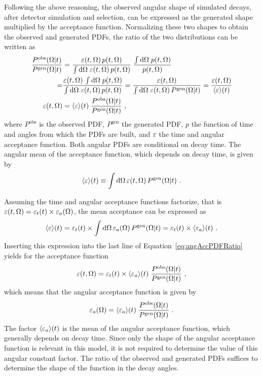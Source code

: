 Following the above reasoning, the observed angular shape of simulated decays, after detector simulation and selection, can be expressed as
the generated shape multiplied by the acceptance function. Normalizing these two shapes to obtain the observed and generated PDFs, the
ratio of the two distributions can be written as
\begin{equation}
  \begin{aligned}
    \frac{P^\text{obs}(\Omega|t)}{P^\text{gen}(\Omega|t)}
        &= \frac{\varepsilon(t,\Omega)\, p(t,\Omega)}{\int\mathrm{d}\Omega\; \varepsilon(t,\Omega)\, p(t,\Omega)}\; \frac{\int\mathrm{d}\Omega\; p(t,\Omega)}{p(t,\Omega)}\\
         = &\frac{\varepsilon(t,\Omega)\, \int\mathrm{d}\Omega\; p(t,\Omega)}{\int\mathrm{d}\Omega\; \varepsilon(t,\Omega)\, p(t,\Omega)}
         = \frac{\varepsilon(t,\Omega)}{\int\mathrm{d}\Omega\; \varepsilon(t,\Omega)\, P^\text{gen}(\Omega|t)}
         = \frac{\varepsilon(t,\Omega)}{\langle\varepsilon\rangle(t)}\\
        \varepsilon(t,\Omega) &= \langle\varepsilon\rangle(t)\; \frac{P^\text{obs}(\Omega|t)}{P^\text{gen}(\Omega|t)} \ ,
  \end{aligned}
  \label{eq:angAccPDFRatio}
\end{equation}
where $P^\text{obs}$ is the observed PDF, $P^\text{gen}$ the generated PDF, $p$ the function of time and angles from which the PDFs are
built, and $\varepsilon$ the time and angular acceptance function. Both angular PDFs are conditional on decay time. The angular mean of the
acceptance function, which depends on decay time, is given by
\begin{equation}
  \langle\varepsilon\rangle(t) \equiv \int\mathrm{d}\Omega\, \varepsilon(t,\Omega)\, P^\text{gen}(\Omega|t)\ .
\end{equation}

Assuming the time and angular acceptance functions factorize, that is $\varepsilon(t,\Omega) = \varepsilon_t(t) \times \varepsilon_a(\Omega)$, the mean acceptance can be expressed
as
\begin{equation}
  \langle\varepsilon\rangle(t) = \varepsilon_t(t) \times \int\mathrm{d}\Omega\, \varepsilon_a(\Omega)\, P^\text{gen}(\Omega|t)
           = \varepsilon_t(t) \times \langle\varepsilon_a\rangle(t) \ .
\end{equation}
Inserting this expression into the last line of Equation~\ref{eq:angAccPDFRatio} yields for the acceptance function
\begin{equation}
  \varepsilon(t,\Omega) = \varepsilon_t(t) \times \langle\varepsilon_a\rangle(t)\; \frac{P^\text{obs}(\Omega|t)}{P^\text{gen}(\Omega|t)}\ ,
\end{equation}
which means that the angular acceptance function is given by
\begin{equation}
  \label{eq:angAcc}
  \varepsilon_a(\Omega) = \langle\varepsilon_a\rangle(t)\; \frac{P^\text{obs}(\Omega|t)}{P^\text{gen}(\Omega|t)}\ .
\end{equation}
The factor $\langle\varepsilon_a\rangle(t)$ is the mean of the angular acceptance function, which generally depends on decay time. Since only the shape of the
angular acceptance function is relevant in this model, it is not required to determine the value of this angular constant factor. The ratio
of the observed and generated PDFs suffices to determine the shape of the function in the decay angles.


